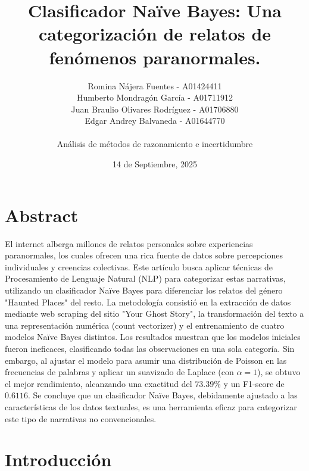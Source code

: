 \documentclass[12pt, letterpaper]{report}
\title{Clasificador Naïve Bayes: Una categorización de relatos de fenómenos paranormales.}
\author{ Romina Nájera Fuentes - A01424411 \\ Humberto Mondragón García - A01711912 \\ Juan Braulio Olivares Rodríguez - A01706880 \\ Edgar Andrey Balvaneda - A01644770
 \\ \\ Análisis de métodos de razonamiento e incertidumbre}
\date{14 de Septiembre, 2025}
\begin{document}
\maketitle
\section*{Abstract}

El internet alberga millones de relatos personales sobre experiencias paranormales, los cuales ofrecen una rica fuente de datos sobre percepciones individuales y creencias colectivas. Este artículo busca aplicar técnicas de Procesamiento de Lenguaje Natural (NLP) para categorizar estas narrativas, utilizando un clasificador Naïve Bayes para diferenciar los relatos del género "Haunted Places" del resto. La metodología consistió en la extracción de datos mediante web scraping del sitio "Your Ghost Story", la transformación del texto a una representación numérica (count vectorizer) y el entrenamiento de cuatro modelos Naïve Bayes distintos. Los resultados muestran que los modelos iniciales fueron ineficaces, clasificando todas las observaciones en una sola categoría. Sin embargo, al ajustar el modelo para asumir una distribución de Poisson en las frecuencias de palabras y aplicar un suavizado de Laplace (con $\alpha=1$), se obtuvo el mejor rendimiento, alcanzando una exactitud del $73.39\%$ y un F1-score de $0.6116$. Se concluye que un clasificador Naïve Bayes, debidamente ajustado a las características de los datos textuales, es una herramienta eficaz para categorizar este tipo de narrativas no convencionales.
\\
\section*{Introducción}
\end{document}
